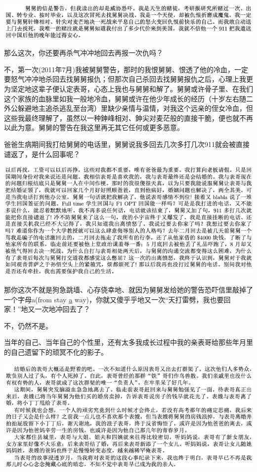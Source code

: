 \documentclass[9pt, b5paper]{article}
\begin{document}
\begin{center}
\includegraphics[width=.9\linewidth]{./pic/p1p67-2.png}
\end{center}

那么这次，你还要再杀气冲冲地回去再报一次仇吗？

不，第一次(2011年7月)我被舅舅警告，那时的我恨舅舅、恨透了他的冷血，一定要怒气冲冲地杀回去找舅舅报仇；但那次自己杀回去找舅舅报仇之后，心理上我更为坚定地这辈子便认定表哥，心态上我也与舅舅和解了。舅舅或许骨子里、在我们这个家族的血脉里如我一般地冷血，舅舅或许在他少年成长的经历（十岁左右随二外公躲避地主追杀逃乱至台湾）里缺少亲情与温情，对我这个远亲的侄女冷血，但这些我最终理解了，虽然以一种鉮峰相对、鉮尖对麦茫般的直接干脆，便也就不再以此为意。舅舅的警告在我这里再无其它任何或更多恶意。 

爸爸生病期间我打给舅舅的电话里，舅舅说我多回去几次多打几次911就会被直接谴返了，是什么回事呢？

\begin{center}
\includegraphics[width=.9\linewidth]{./pic/p1p76-2.png}
\end{center}

那你这次不就是狗急跳墙、心存侥幸地、就因为舅舅发给她的警告恐吓信里敲掉了一个字母a(from stay \uline{a} way)，你就又傻乎乎地又一次“天打雷劈，我也要回家！”地又一次地冲回去了？

不，仍然不是。 

当年的自己、当年自己的个性里，还有太多我成长过程中我的亲表哥给那些年月里的自己遗留下的顽冥不化的影子。

\begin{center}
\includegraphics[width=.9\linewidth]{./pic/p1p88.png}
\end{center}
\end{document}
